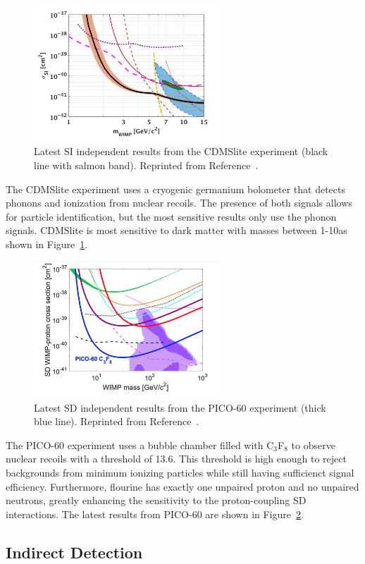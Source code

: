 \begin{figure}[htbp]
  \centering
  \includegraphics[width=0.625\textwidth]{DarkMatter/Figures/cdms.png}
  \caption{
    Latest SI independent results from the CDMSlite experiment (black line with salmon band).
    Reprinted from Reference~\cite{}. %
  }
  \label{fig:dm_cdms}
\end{figure}

The CDMSlite experiment uses a cryogenic germanium bolometer that detects phonons and ionization from nuclear recoils.
The presence of both signals allows for particle identification, but the most sensitive results only use the phonon signals.
CDMSlite is most sensitive to dark matter with masses between 1-10\GeV as shown in Figure~\ref{fig:dm_cdms}.

\begin{figure}[htbp]
  \centering
  \includegraphics[width=0.625\textwidth]{DarkMatter/Figures/pico.png}
  \caption{
    Latest SD independent results from the PICO-60 experiment (thick blue line).
    Reprinted from Reference~\cite{}. %
  }
  \label{fig:dm_pico}
\end{figure}

The PICO-60 experiment uses a bubble chamber filled with C$_3$F$_8$ to observe nuclear recoils with a threshold of 13.6\keV.
This threshold is high enough to reject backgrounds from minimum ionizing particles while still having sufficienct signal efficiency.
Furthermore, flourine has exactly one unpaired proton and no unpaired neutrons, greatly enhancing the sensitivity to the proton-coupling SD interactions.
The latest results from PICO-60 are shown in Figure~\ref{fig:dm_pico}. 


\subsection{Indirect Detection}
\label{sec:dm_indirect}


